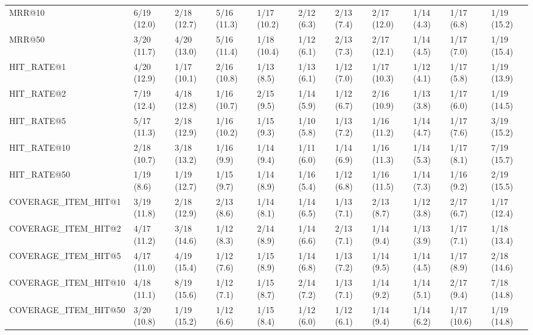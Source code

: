 \begin{tabular}{lllllllllll}
MRR@10                      &    6/19 (12.0) &    2/18 (12.7) &     5/16 (11.3) &      1/17 (10.2) &  2/12 (6.3) &  2/13 (7.4) &  2/17 (12.0) &     1/14 (4.3) &            1/17 (6.8) &        1/19 (15.2) \\
MRR@50                      &    3/20 (11.7) &    4/20 (13.0) &     5/16 (11.4) &      1/18 (10.4) &  1/12 (6.1) &  2/13 (7.3) &  2/17 (12.1) &     1/14 (4.5) &            1/17 (7.0) &        1/19 (15.4) \\
HIT_RATE@1                  &    4/20 (12.9) &    1/17 (10.1) &     2/16 (10.8) &       1/13 (8.5) &  1/13 (6.1) &  1/12 (7.0) &  1/17 (10.3) &     1/12 (4.1) &            1/17 (5.8) &        1/19 (13.9) \\
HIT_RATE@2                  &    7/19 (12.4) &    4/18 (12.8) &     1/16 (10.7) &       2/15 (9.5) &  1/14 (5.9) &  1/12 (6.7) &  2/16 (10.9) &     1/13 (3.8) &            1/17 (6.0) &        1/19 (14.5) \\
HIT_RATE@5                  &    5/17 (11.3) &    2/18 (12.9) &     1/16 (10.2) &       1/15 (9.3) &  1/10 (5.8) &  1/13 (7.2) &  1/16 (11.2) &     1/14 (4.7) &            1/17 (7.6) &        3/19 (15.2) \\
HIT_RATE@10                 &    2/18 (10.7) &    3/18 (13.2) &      1/16 (9.9) &       1/14 (9.4) &  1/11 (6.0) &  1/14 (6.9) &  1/16 (11.3) &     1/14 (5.3) &            1/17 (8.1) &        7/19 (15.7) \\
HIT_RATE@50                 &     1/19 (8.6) &    1/19 (12.7) &      1/15 (9.7) &       1/14 (8.9) &  1/16 (5.4) &  1/12 (6.8) &  1/16 (11.5) &     1/14 (7.3) &            1/16 (9.2) &        2/19 (15.5) \\
COVERAGE_ITEM_HIT@1         &    3/19 (11.8) &    2/18 (12.9) &      2/13 (8.6) &       1/14 (8.1) &  1/14 (6.5) &  1/13 (7.1) &   2/13 (8.7) &     1/12 (3.8) &            2/17 (6.7) &        1/17 (12.4) \\
COVERAGE_ITEM_HIT@2         &    4/17 (11.2) &    3/18 (14.6) &      1/12 (8.3) &       2/14 (8.9) &  1/14 (6.6) &  2/13 (7.1) &   1/14 (9.4) &     1/13 (3.9) &            1/17 (7.1) &        1/18 (13.4) \\
COVERAGE_ITEM_HIT@5         &    4/17 (11.0) &    4/19 (15.4) &      1/12 (7.6) &       1/15 (8.9) &  1/14 (6.8) &  1/13 (7.2) &   1/14 (9.5) &     1/14 (4.5) &            1/17 (8.9) &        2/18 (14.6) \\
COVERAGE_ITEM_HIT@10        &    4/18 (11.1) &    8/19 (15.6) &      1/12 (7.1) &       1/15 (8.7) &  2/14 (7.2) &  1/13 (7.1) &   1/14 (9.2) &     1/14 (5.1) &            2/17 (9.4) &        7/18 (14.8) \\
COVERAGE_ITEM_HIT@50        &    3/20 (10.8) &    1/19 (15.2) &      1/12 (6.6) &       1/15 (8.4) &  1/12 (6.0) &  1/12 (6.1) &   1/14 (9.4) &     1/14 (6.2) &           1/17 (10.6) &        1/19 (14.8) \\
\bottomrule
\end{tabular}
